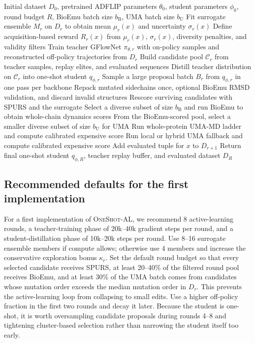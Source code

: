 \documentclass[11pt]{article}
\newcommand{\methodIII}{\textsc{OneShot-AL}}
\begin{document}
\begin{algorithm}[H]
\caption{\methodIII{}: active-learning GFlowNet teacher with one-shot ADFLIP student}
\label{alg:method3}
\begin{algorithmic}[1]
\Require Initial dataset $D_0$, pretrained ADFLIP parameters $\theta_0$, student parameters $\phi_0$, round budget $R$, BioEmu batch size $b_{\mathrm B}$, UMA batch size $b_{\mathrm U}$
    \State Fit surrogate ensemble $M_r$ on $D_r$ to obtain mean $\mu_r(x)$ and uncertainty $\sigma_r(x)$
    \State Define acquisition-based reward $R_r(x)$ from $\mu_r(x)$, $\sigma_r(x)$, diversity penalties, and validity filters
    \State Train teacher GFlowNet $\pi_{\theta,r}$ with on-policy samples and reconstructed off-policy trajectories from $D_r$
    \State Build candidate pool $\mathcal{C}_r$ from teacher samples, replay elites, and evaluated sequences
    \State Distill teacher distribution on $\mathcal{C}_r$ into one-shot student $q_{\phi,r}$
    \State Sample a large proposal batch $B_r$ from $q_{\phi,r}$ in one pass per backbone
    \State Repack mutated sidechains once, optional BioEmu RMSD validation, and discard invalid structures
    \State Rescore surviving candidates with SPURS and the surrogate
    \State Select a diverse subset of size $b_{\mathrm B}$ and run BioEmu to obtain whole-chain dynamics scores
    \State From the BioEmu-scored pool, select a smaller diverse subset of size $b_{\mathrm U}$ for UMA
            \State Run whole-protein UMA-MD ladder and compute calibrated expensive score
        \Else
            \State Run local or hybrid UMA fallback and compute calibrated expensive score
        \EndIf
        \State Add evaluated tuple for $x$ to $D_{r+1}$
    \EndFor
\EndFor
\State Return final one-shot student $q_{\phi,R}$, teacher replay buffer, and evaluated dataset $D_R$
\end{algorithmic}
\end{algorithm}

\subsection{Recommended defaults for the first implementation}

For a first implementation of \methodIII{}, we recommend 8 active-learning rounds, a teacher-training phase of 20k--40k gradient steps per round, and a student-distillation phase of 10k--20k steps per round. Use 8--16 surrogate ensemble members if compute allows; otherwise use 4 members and increase the conservative exploration bonus $\kappa_r$. Set the default round budget so that every selected candidate receives SPURS, at least 20--40\% of the filtered round pool receives BioEmu, and at least 30\% of the UMA batch comes from candidates whose mutation order exceeds the median mutation order in $D_r$. This prevents the active-learning loop from collapsing to small edits. Use a higher off-policy fraction in the first two rounds and decay it later. Because the student is one-shot, it is worth oversampling candidate proposals during rounds 4--8 and tightening cluster-based selection rather than narrowing the student itself too early.
\end{document}
